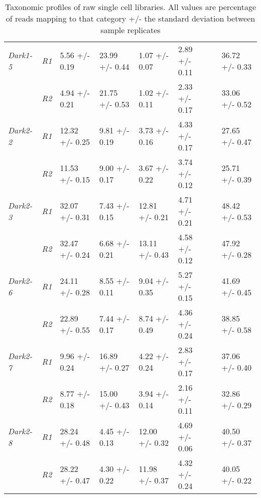 \begin{table}[h]
\begin{tabular}{@{}|l|l|l|l|l|l|l|l|@{}}
         \textit{Dark1-5}     & \textit{R1}          & 5.56 +/- 0.19      & 23.99 +/- 0.44    & 1.07 +/- 0.07      & 2.89 +/- 0.11          &  & 36.72 +/- 0.33      \\ \cmidrule(lr){2-2}
                              & \textit{R2}          & 4.94 +/- 0.21      & 21.75 +/- 0.53    & 1.02 +/- 0.11      & 2.33 +/- 0.17          &  & 33.06 +/- 0.52      \\ \cmidrule(r){1-6} \cmidrule(l){8-8} 
         \textit{Dark2-2}     & \textit{R1}          & 12.32 +/- 0.25     & 9.81 +/- 0.19     & 3.73 +/- 0.16      & 4.33 +/- 0.17          &  & 27.65 +/- 0.47      \\ \cmidrule(lr){2-2}
                              & \textit{R2}          & 11.53 +/- 0.15     & 9.00 +/- 0.17     & 3.67 +/- 0.22      & 3.74 +/- 0.12          &  & 25.71 +/- 0.39      \\ \cmidrule(r){1-6} \cmidrule(l){8-8} 
         \textit{Dark2-3}     & \textit{R1}          & 32.07 +/- 0.31     & 7.43 +/- 0.15     & 12.81 +/- 0.21     & 4.71 +/- 0.21          &  & 48.42 +/- 0.53      \\ \cmidrule(lr){2-2}
                              & \textit{R2}          & 32.47 +/- 0.24     & 6.68 +/- 0.21     & 13.11 +/- 0.43     & 4.58 +/- 0.12          &  & 47.92 +/- 0.28      \\ \cmidrule(r){1-6} \cmidrule(l){8-8} 
         \textit{Dark2-6}     & \textit{R1}          & 24.11 +/- 0.28     & 8.55 +/- 0.11     & 9.04 +/- 0.35      & 5.27 +/- 0.15          &  & 41.69 +/- 0.45      \\ \cmidrule(lr){2-2}
                              & \textit{R2}          & 22.89 +/- 0.55     & 7.44 +/- 0.17     & 8.74 +/- 0.49      & 4.36 +/- 0.24          &  & 38.85 +/- 0.58      \\ \cmidrule(r){1-6} \cmidrule(l){8-8} 
         \textit{Dark2-7}     & \textit{R1}          & 9.96 +/- 0.24      & 16.89 +/- 0.27    & 4.22 +/- 0.24      & 2.83 +/- 0.17          &  & 37.06 +/- 0.40      \\ \cmidrule(lr){2-2}
                              & \textit{R2}          & 8.77 +/- 0.18      & 15.00 +/- 0.43    & 3.94 +/- 0.14      & 2.16 +/- 0.11          &  & 32.86 +/- 0.29      \\ \cmidrule(r){1-6} \cmidrule(l){8-8} 
         \textit{Dark2-8}     & \textit{R1}          & 28.24 +/- 0.48     & 4.45 +/- 0.13     & 12.00 +/- 0.32     & 4.69 +/- 0.06          &  & 40.50 +/- 0.37      \\ \cmidrule(lr){2-2}
                              & \textit{R2}          & 28.22 +/- 0.47     & 4.30 +/- 0.22     & 11.98 +/- 0.37     & 4.32 +/- 0.24          &  & 40.05 +/- 0.22      \\ \cmidrule(r){1-6} \cmidrule(l){8-8} 
     \end{tabular}
     \caption{Taxonomic profiles of raw single cell libraries. All values are percentage of reads mapping to that category +/- the standard deviation between sample replicates}
 \label{tab:sct_duey}
\end{table}

